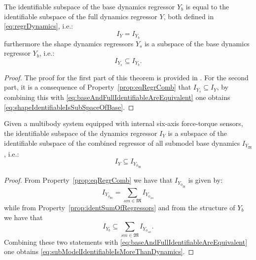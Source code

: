 \begin{theorem}
The identifiable subspace of the base dynamics regressor $Y_b$ is equal to the identifiable subspace of the full dynamics regressor $Y$, both defined in \eqref{eq:regrDynamics}, i.e.: 
\begin{equation}
\label{eq:baseAndFullIdentifiableAreEquivalent}
I_{Y} = I_{{Y}_b}
\end{equation}
furthermore the shape dynamics regressors $Y_{s}$ is a subspace of the base dynamics regressor $Y_b$, i.e.:
\begin{equation}
\label{eq:shapeIdentifiableIsSubSpaceOfBase}
I_{Y_s} \subseteq I_{{Y}_b} .
\end{equation}

\end{theorem}
\begin{proof}
The proof for the first part of this theorem is provided in \citep{ayusawa2013}. For the second part, it is a consequence of Property~\ref{prop:eqRegrComb} that $I_{Y_s} \subseteq I_{{Y}}$, by combining this with \eqref{eq:baseAndFullIdentifiableAreEquivalent} one obtains \eqref{eq:shapeIdentifiableIsSubSpaceOfBase}.
\end{proof}

\begin{theorem}
 Given a multibody system equipped with internal six-axis force-torque sensors, the identifiable subspace of the dynamics regressor $I_Y$ is a subspace of the identifiable subspace of the combined regressor of all submodel base dynamics $I_{Y_{\mathfrak{M}}}$, i.e.: 
 \begin{equation}
 \label{eq:subModelIdentifiableIsMoreThanDynamics}
I_Y \subseteq I_{Y_{\phi_\mathfrak{M}}}  
 \end{equation}
\end{theorem}
\begin{proof}
From Property~\ref{prop:eqRegrComb} we have that $I_{Y_{\phi_\mathfrak{M}}}$ is given by:
\begin{equation}
I_{Y_{\phi_\mathfrak{M}}} = \sum_{sm \in \mathfrak{M}} I_{Y_{\phi_{sm}}}
\end{equation}
while from Property~\ref{prop:identSumOfRegressors} and from the structure of $Y_b$ we have that
\begin{equation}
I_{Y_b} \subseteq \sum_{sm \in \mathfrak{M}} I_{Y_{\phi_{sm}}}. 
\end{equation}
Combining these two statements with \eqref{eq:baseAndFullIdentifiableAreEquivalent} one obtains \eqref{eq:subModelIdentifiableIsMoreThanDynamics}.
\end{proof}

